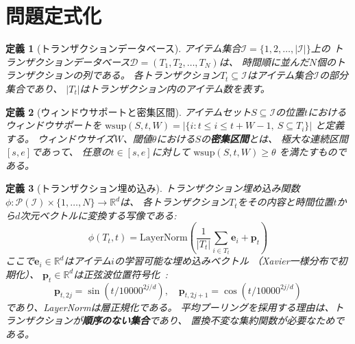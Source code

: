 \documentclass[sigconf,nonacm]{acmart}
\newtheorem{definition}{定義}
\begin{document}
\section{問題定式化}
\label{sec:formulation}

\begin{definition}[トランザクションデータベース]
\label{def:transaction-db}
アイテム集合$\mathcal{I} = \{1, 2, \ldots, |\mathcal{I}|\}$上の
トランザクションデータベース$\mathcal{D} = (T_1, T_2, \ldots, T_N)$は、
時間順に並んだ$N$個のトランザクションの列である。
各トランザクション$T_t \subseteq \mathcal{I}$はアイテム集合$\mathcal{I}$の部分集合であり、
$|T_t|$はトランザクション内のアイテム数を表す。
\end{definition}

\begin{definition}[ウィンドウサポートと密集区間]
\label{def:dense-interval}
アイテムセット$S \subseteq \mathcal{I}$の位置$t$におけるウィンドウサポートを
$\text{wsup}(S, t, W) = |\{i : t \leq i \leq t + W - 1,\ S \subseteq T_i\}|$
と定義する。
ウィンドウサイズ$W$、閾値$\theta$における$S$の\textbf{密集区間}とは、
極大な連続区間$[s, e]$であって、
任意の$t \in [s, e]$に対して
$\text{wsup}(S, t, W) \geq \theta$
を満たすものである。
\end{definition}

\begin{definition}[トランザクション埋め込み]
\label{def:transaction-embedding}
トランザクション埋め込み関数$\phi: \mathcal{P}(\mathcal{I}) \times \{1,\ldots,N\} \to \mathbb{R}^d$は、
各トランザクション$T_t$をその内容と時間位置$t$から$d$次元ベクトルに変換する写像である:
\begin{equation}
\label{eq:embedding}
    \phi(T_t, t) = \text{LayerNorm}\left(\frac{1}{|T_t|}\sum_{i \in T_t} \mathbf{e}_i + \mathbf{p}_t\right)
\end{equation}
ここで$\mathbf{e}_i \in \mathbb{R}^d$はアイテム$i$の学習可能な埋め込みベクトル
（Xavier一様分布で初期化）、
$\mathbf{p}_t \in \mathbb{R}^d$は正弦波位置符号化~\cite{vaswani2017attention}:
\begin{equation}
    \mathbf{p}_{t,2j} = \sin(t / 10000^{2j/d}), \quad
    \mathbf{p}_{t,2j+1} = \cos(t / 10000^{2j/d})
\end{equation}
であり、LayerNormは層正規化である。
平均プーリングを採用する理由は、トランザクションが\textbf{順序のない集合}であり、
置換不変な集約関数が必要なためである。
\end{definition}
\end{document}
